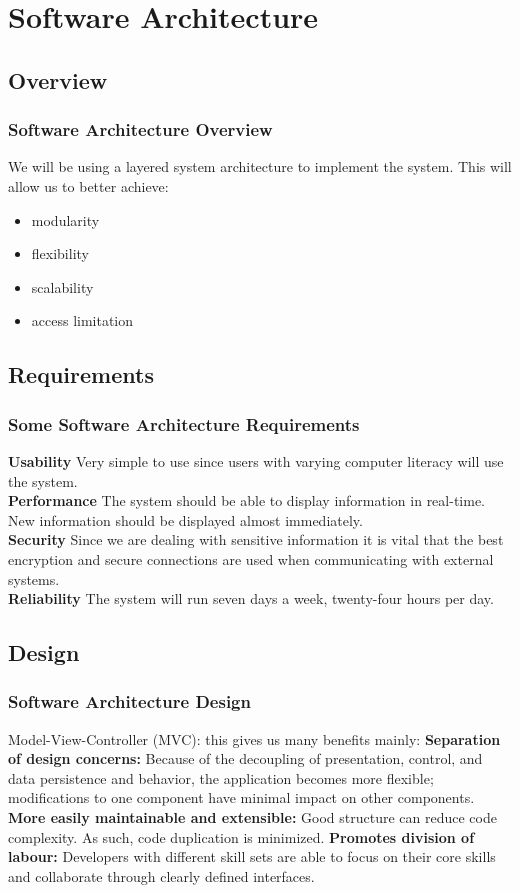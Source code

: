 \documentclass{beamer}
\begin{document}
\section{Software Architecture}
	\subsection{Overview}
		\begin{frame}
		\frametitle{Software Architecture Overview}
			We will be using a layered system architecture to implement the system. This will allow us to better achieve:
			\begin{itemize}
				\item modularity
				\item flexibility
				\item scalability
				\item access limitation
			\end{itemize}
		\end{frame}
		
	\subsection{Requirements}
		\begin{frame}
		\frametitle{Some Software Architecture Requirements}
			\textbf{Usability} Very simple to use since users with varying computer literacy will use the system.\\
			\textbf{Performance} The system should be able to display information in real-time. New information should be displayed almost immediately.\\
			\textbf{Security} Since we are dealing with sensitive information it is vital that the best encryption and secure connections are used when communicating with external systems.\\
			\textbf{Reliability} The system will run seven days a week, twenty-four hours per day.
		\end{frame}
		
	\subsection{Design}
		\begin{frame}
		\frametitle{Software Architecture Design}
		 Model-View-Controller (MVC): this gives us many benefits mainly:
         	\textbf{Separation of design concerns:} Because of the decoupling of presentation, control, and data persistence and behavior, the application becomes more ﬂexible; modifications to one component have minimal impact on other components.\\
        	\textbf{More easily maintainable and extensible:} Good structure can reduce code complexity. As such, code duplication is minimized.
        	\textbf{Promotes division of labour:} Developers with different skill sets are able to focus on their core skills and collaborate through clearly defined interfaces.\\
		\end{frame}
		
\end{document}
